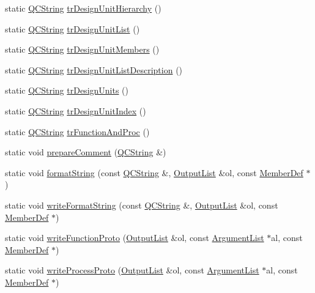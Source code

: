 \begin{DoxyCompactItemize}
\item 
static \hyperlink{class_q_c_string}{Q\+C\+String} \hyperlink{class_vhdl_doc_gen_a0a7d5c59311faa783cc3ec3daea29826}{tr\+Design\+Unit\+Hierarchy} ()
\item 
static \hyperlink{class_q_c_string}{Q\+C\+String} \hyperlink{class_vhdl_doc_gen_a8b0fd3c3e1ae7d234f3671b29525cf9e}{tr\+Design\+Unit\+List} ()
\item 
static \hyperlink{class_q_c_string}{Q\+C\+String} \hyperlink{class_vhdl_doc_gen_a58b89b76fb84bb4bcfa1e482d3b9e727}{tr\+Design\+Unit\+Members} ()
\item 
static \hyperlink{class_q_c_string}{Q\+C\+String} \hyperlink{class_vhdl_doc_gen_af4139f69442e7c7d0ced59570e34f1c3}{tr\+Design\+Unit\+List\+Description} ()
\item 
static \hyperlink{class_q_c_string}{Q\+C\+String} \hyperlink{class_vhdl_doc_gen_a796d5fa8a62c0e734d75e37126786714}{tr\+Design\+Units} ()
\item 
static \hyperlink{class_q_c_string}{Q\+C\+String} \hyperlink{class_vhdl_doc_gen_a2905e0b83f5e95ca79104ac61c52ee7d}{tr\+Design\+Unit\+Index} ()
\item 
static \hyperlink{class_q_c_string}{Q\+C\+String} \hyperlink{class_vhdl_doc_gen_a49df715b5535e59f36c266c67cbf514f}{tr\+Function\+And\+Proc} ()
\item 
static void \hyperlink{class_vhdl_doc_gen_a802a7b8116fa1b8b46895c25a32c5677}{prepare\+Comment} (\hyperlink{class_q_c_string}{Q\+C\+String} \&)
\item 
static void \hyperlink{class_vhdl_doc_gen_aacccadab8f7d60dc0e4b2892ea724c2b}{format\+String} (const \hyperlink{class_q_c_string}{Q\+C\+String} \&, \hyperlink{class_output_list}{Output\+List} \&ol, const \hyperlink{class_member_def}{Member\+Def} $\ast$)
\item 
static void \hyperlink{class_vhdl_doc_gen_a0b58904c2803fe64c007b6c3ddda086e}{write\+Format\+String} (const \hyperlink{class_q_c_string}{Q\+C\+String} \&, \hyperlink{class_output_list}{Output\+List} \&ol, const \hyperlink{class_member_def}{Member\+Def} $\ast$)
\item 
static void \hyperlink{class_vhdl_doc_gen_ab1d66321a2c118a9376b65aeb598a49c}{write\+Function\+Proto} (\hyperlink{class_output_list}{Output\+List} \&ol, const \hyperlink{class_argument_list}{Argument\+List} $\ast$al, const \hyperlink{class_member_def}{Member\+Def} $\ast$)
\item 
static void \hyperlink{class_vhdl_doc_gen_a94ad80db8536156393a701496506c052}{write\+Process\+Proto} (\hyperlink{class_output_list}{Output\+List} \&ol, const \hyperlink{class_argument_list}{Argument\+List} $\ast$al, const \hyperlink{class_member_def}{Member\+Def} $\ast$)

\end{DoxyCompactItemize}
